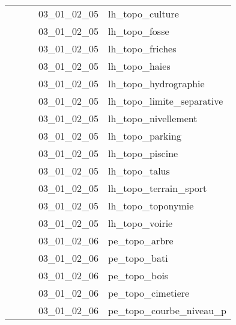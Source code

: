 \documentclass[12pt,titlepage,oneside]{book}
\begin{document}
\begin{supertabular}{|p{7.5cm}|p{7.5cm}|p{7.5cm}|c|p{10cm}|}
                   &                    &                    & 03\_01\_02\_05 & lh\_topo\_culture\\
                   &                    &                    & 03\_01\_02\_05 & lh\_topo\_fosse\\
                   &                    &                    & 03\_01\_02\_05 & lh\_topo\_friches\\
                   &                    &                    & 03\_01\_02\_05 & lh\_topo\_haies\\
                   &                    &                    & 03\_01\_02\_05 & lh\_topo\_hydrographie\\
                   &                    &                    & 03\_01\_02\_05 & lh\_topo\_limite\_separative\\
                   &                    &                    & 03\_01\_02\_05 & lh\_topo\_nivellement\\
                   &                    &                    & 03\_01\_02\_05 & lh\_topo\_parking\\
                   &                    &                    & 03\_01\_02\_05 & lh\_topo\_piscine\\
                   &                    &                    & 03\_01\_02\_05 & lh\_topo\_talus\\
                   &                    &                    & 03\_01\_02\_05 & lh\_topo\_terrain\_sport\\
                   &                    &                    & 03\_01\_02\_05 & lh\_topo\_toponymie\\
                   &                    &                    & 03\_01\_02\_05 & lh\_topo\_voirie\\
                   &                    &                    & 03\_01\_02\_06 & pe\_topo\_arbre\\
                   &                    &                    & 03\_01\_02\_06 & pe\_topo\_bati\\
                   &                    &                    & 03\_01\_02\_06 & pe\_topo\_bois\\
                   &                    &                    & 03\_01\_02\_06 & pe\_topo\_cimetiere\\
                   &                    &                    & 03\_01\_02\_06 & pe\_topo\_courbe\_niveau\_p\\

\end{supertabular}
\end{document}
